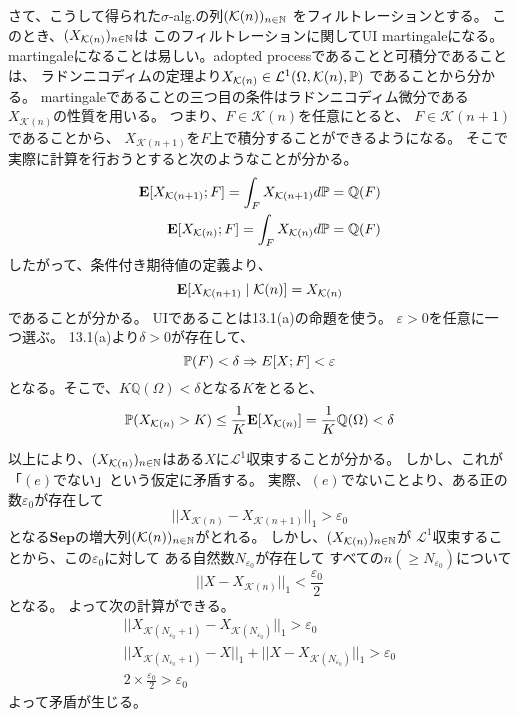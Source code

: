       さて、こうして得られた$\sigma$-alg.の列$(\mathcal{K}(n))_{n \in {\mathbb{N}}}$
      をフィルトレーションとする。
      このとき、$(X_{\mathcal{K}(n)})_{n \in {\mathbb{N}}}$は
      このフィルトレーションに関してUI martingaleになる。
      martingaleになることは易しい。adopted processであることと可積分であることは、
      ラドンニコディムの定理より$X_{\mathcal{K}(n)} \in \mathcal{L}^1(\Omega, \mathcal{K}(n), {\mathbb{P}})$
      であることから分かる。
      martingaleであることの三つ目の条件はラドンニコディム微分である$X_{\mathcal{K}(n)}$の性質を用いる。
      つまり、$F \in \mathcal{K}(n)$を任意にとると、
      $F \in \mathcal{K}(n+1)$であることから、
      $X_{\mathcal{K}(n+1)}$を$F$上で積分することができるようになる。
      そこで実際に計算を行おうとすると次のようなことが分かる。
      \begin{align*}
        {\mathbf{E}}[X_{\mathcal{K}(n+1)} ; F] = \int_F X_{\mathcal{K}(n+1)}d{\mathbb{P}} = \mathbb{Q}(F)\\
        {\mathbf{E}}[X_{\mathcal{K}(n)} ; F] = \int_F X_{\mathcal{K}(n)}d{\mathbb{P}} = \mathbb{Q}(F)
      \end{align*}
      したがって、条件付き期待値の定義より、
      \[
        {\mathbf{E}}[X_{\mathcal{K}(n+1)} \mid \mathcal{K}(n)] = X_{\mathcal{K}(n)}
      \]
      であることが分かる。
      UIであることは13.1(a)の命題を使う。
      $\varepsilon > 0$を任意に一つ選ぶ。
      13.1(a)より$\delta > 0$が存在して、
      \[
        {\mathbb{P}}(F) < \delta \Rightarrow E[X;F] < \varepsilon
      \]
      となる。そこで、$K\mathbb{Q}(\Omega) < \delta$となる$K$をとると、
      \[
        {\mathbb{P}}(X_{\mathcal{K}(n)} > K) \leq \frac{1}{K} {\mathbf{E}}[X_{\mathcal{K}(n)}] = \frac{1}{K}\mathbb{Q}(\Omega) < \delta
      \]

      以上により、$(X_{\mathcal{K}(n)})_{n \in {\mathbb{N}}}$はある$X$に$\mathcal{L}^1$収束することが分かる。
      しかし、これが「$(e)$でない」という仮定に矛盾する。
      実際、$(e)$でないことより、ある正の数$\varepsilon_0$が存在して
      \[
        ||X_{\mathcal{K}(n)} - X_{\mathcal{K}(n+1)}||_1 > \varepsilon_0
      \]
      となる$\mathbf{Sep}$の増大列$(\mathcal{K}(n))_{n \in {\mathbb{N}}}$がとれる。
      しかし、$(X_{\mathcal{K}(n)})_{n \in {\mathbb{N}}}$が
      $\mathcal{L}^1$収束することから、この$\varepsilon_0$に対して
      ある自然数$N_{\varepsilon_0}$が存在して
      すべての$n (\ge N_{\varepsilon_0})$について
      \[
        ||X - X_{\mathcal{K}(n)}||_1 < \frac{\varepsilon_0}{2}
      \]
      となる。
      よって次の計算ができる。
      \begin{align*}
        ||X_{\mathcal{K}(N_{\varepsilon_0} + 1)} - X_{\mathcal{K}(N_{\varepsilon_0})}||_1 > \varepsilon_0\\
        ||X_{\mathcal{K}(N_{\varepsilon_0} + 1)} - X||_1 +  ||X - X_{\mathcal{K}(N_{\varepsilon_0})}||_1 > \varepsilon_0\\
        2 \times \frac{\varepsilon_0}{2} > \varepsilon_0
      \end{align*}
      よって矛盾が生じる。

